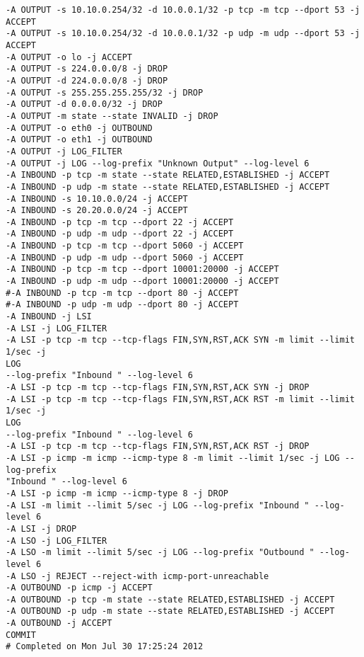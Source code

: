 \documentclass[a4paper,12pt]{report}
\newenvironment{myscriptlisting}
{\begin{list}{}{\setlength{\leftmargin}{1em}}\item\scriptsize\bfseries}
{\end{list}}
\begin{document}
\begin{myscriptlisting}
\begin{verbatim}
-A OUTPUT -s 10.10.0.254/32 -d 10.0.0.1/32 -p tcp -m tcp --dport 53 -j ACCEPT 
-A OUTPUT -s 10.10.0.254/32 -d 10.0.0.1/32 -p udp -m udp --dport 53 -j ACCEPT 
-A OUTPUT -o lo -j ACCEPT 
-A OUTPUT -s 224.0.0.0/8 -j DROP 
-A OUTPUT -d 224.0.0.0/8 -j DROP 
-A OUTPUT -s 255.255.255.255/32 -j DROP 
-A OUTPUT -d 0.0.0.0/32 -j DROP 
-A OUTPUT -m state --state INVALID -j DROP 
-A OUTPUT -o eth0 -j OUTBOUND 
-A OUTPUT -o eth1 -j OUTBOUND 
-A OUTPUT -j LOG_FILTER 
-A OUTPUT -j LOG --log-prefix "Unknown Output" --log-level 6 
-A INBOUND -p tcp -m state --state RELATED,ESTABLISHED -j ACCEPT 
-A INBOUND -p udp -m state --state RELATED,ESTABLISHED -j ACCEPT 
-A INBOUND -s 10.10.0.0/24 -j ACCEPT 
-A INBOUND -s 20.20.0.0/24 -j ACCEPT 
-A INBOUND -p tcp -m tcp --dport 22 -j ACCEPT 
-A INBOUND -p udp -m udp --dport 22 -j ACCEPT 
-A INBOUND -p tcp -m tcp --dport 5060 -j ACCEPT 
-A INBOUND -p udp -m udp --dport 5060 -j ACCEPT 
-A INBOUND -p tcp -m tcp --dport 10001:20000 -j ACCEPT
-A INBOUND -p udp -m udp --dport 10001:20000 -j ACCEPT 
#-A INBOUND -p tcp -m tcp --dport 80 -j ACCEPT 
#-A INBOUND -p udp -m udp --dport 80 -j ACCEPT 
-A INBOUND -j LSI 
-A LSI -j LOG_FILTER 
-A LSI -p tcp -m tcp --tcp-flags FIN,SYN,RST,ACK SYN -m limit --limit 1/sec -j
LOG
--log-prefix "Inbound " --log-level 6 
-A LSI -p tcp -m tcp --tcp-flags FIN,SYN,RST,ACK SYN -j DROP 
-A LSI -p tcp -m tcp --tcp-flags FIN,SYN,RST,ACK RST -m limit --limit 1/sec -j
LOG
--log-prefix "Inbound " --log-level 6 
-A LSI -p tcp -m tcp --tcp-flags FIN,SYN,RST,ACK RST -j DROP 
-A LSI -p icmp -m icmp --icmp-type 8 -m limit --limit 1/sec -j LOG --log-prefix
"Inbound " --log-level 6 
-A LSI -p icmp -m icmp --icmp-type 8 -j DROP 
-A LSI -m limit --limit 5/sec -j LOG --log-prefix "Inbound " --log-level 6 
-A LSI -j DROP 
-A LSO -j LOG_FILTER 
-A LSO -m limit --limit 5/sec -j LOG --log-prefix "Outbound " --log-level 6 
-A LSO -j REJECT --reject-with icmp-port-unreachable 
-A OUTBOUND -p icmp -j ACCEPT 
-A OUTBOUND -p tcp -m state --state RELATED,ESTABLISHED -j ACCEPT 
-A OUTBOUND -p udp -m state --state RELATED,ESTABLISHED -j ACCEPT 
-A OUTBOUND -j ACCEPT 
COMMIT
# Completed on Mon Jul 30 17:25:24 2012
\end{verbatim}
\end{myscriptlisting}
\end{document}
